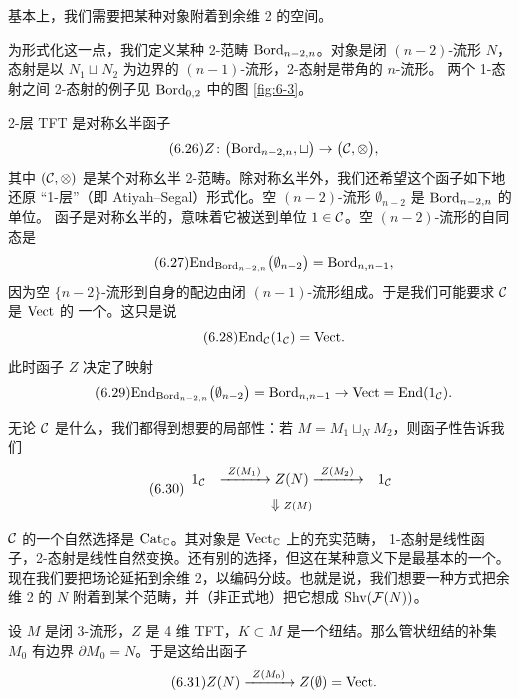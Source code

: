 基本上，我们需要把某种对象附着到余维 2 的空间。

为形式化这一点，我们定义某种 2-范畴 $\mathrm{Bord}_{n-2,n}$。对象是闭 $(n-2)$-流形 $N$，
态射是以 $N_1\sqcup N_2$ 为边界的 $(n-1)$-流形，2-态射是带角的 $n$-流形。
两个 1-态射之间 2-态射的例子见 $\mathrm{Bord}_{0,2}$ 中的图 \ref{fig:6-3}。

2-层 TFT 是对称幺半函子
\begin{equation}\tag{6.26}\label{eq:6.26}
Z\colon\bigl(\mathrm{Bord}_{n-2,n},\sqcup\bigr)\to\bigl(\mathcal{C},\otimes\bigr),
\end{equation}
其中 $(\mathcal{C},\otimes)$ 是某个对称幺半 2-范畴。除对称幺半外，我们还希望这个函子如下地还原
“1-层”（即 Atiyah--Segal）形式化。空 $(n-2)$-流形 $\emptyset_{n-2}$ 是 $\mathrm{Bord}_{n-2,n}$ 的单位。
函子是对称幺半的，意味着它被送到单位 $1\in\mathcal{C}$。空 $(n-2)$-流形的自同态是
\begin{equation}\tag{6.27}\label{eq:6.27}
\mathrm{End}_{\mathrm{Bord}_{n-2,n}}\bigl(\emptyset_{n-2}\bigr)=\mathrm{Bord}_{n,n-1},
\end{equation}
因为空 $\{n-2\}$-流形到自身的配边由闭 $(n-1)$-流形组成。于是我们可能要求 $\mathcal{C}$ 是 $\mathrm{Vect}$ 的
一个。这只是说
\begin{equation}\tag{6.28}\label{eq:6.28}
\mathrm{End}_{\mathcal{C}}(1_{\mathcal{C}})=\mathrm{Vect} .
\end{equation}
此时函子 $Z$ 决定了映射
\begin{equation}\tag{6.29}\label{eq:6.29}
\mathrm{End}_{\mathrm{Bord}_{n-2,n}}\bigl(\emptyset_{n-2}\bigr)=\mathrm{Bord}_{n,n-1}\to\mathrm{Vect}=\mathrm{End}(1_{\mathcal{C}}).
\end{equation}

无论 $\mathcal{C}$ 是什么，我们都得到想要的局部性：若 $M=M_1\sqcup_N M_2$，则函子性告诉我们
\begin{equation}\tag{6.30}\label{eq:6.30}
\begin{array}{ccc}
1_{\mathcal{C}} & \xrightarrow{\ Z(M_1)\ } Z(N) \xrightarrow{\ Z(M_2)\ } & 1_{\mathcal{C}}\\[6pt]
& \Downarrow{\scriptstyle Z(M)} &
\end{array}
\end{equation}

$\mathcal{C}$ 的一个自然选择是 $\mathrm{Cat}_{\mathbb{C}}$。其对象是 $\mathrm{Vect}_{\mathbb{C}}$ 上的充实范畴，
1-态射是线性函子，2-态射是线性自然变换。还有别的选择，但这在某种意义下是最基本的一个。
现在我们要把场论延拓到余维 2，以编码分歧。也就是说，我们想要一种方式把余维 2 的 $N$
附着到某个范畴，并（非正式地）把它想成 $\mathrm{Shv}(\mathcal{F}(N))$。

设 $M$ 是闭 3-流形，$Z$ 是 4 维 TFT，$K\subset M$ 是一个纽结。那么管状纽结的补集 $M_0$ 有边界
$\partial M_0=N$。于是这给出函子
\begin{equation}\tag{6.31}\label{eq:6.31}
Z(N)\xrightarrow{\ Z(M_0)\ } Z(\emptyset)=\mathrm{Vect} .
\end{equation}

